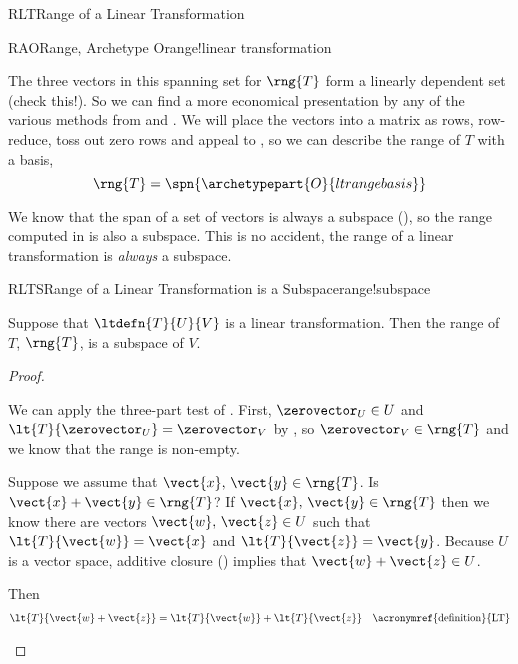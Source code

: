 \begin{subsect}{RLT}{Range of a Linear Transformation}
\begin{example}{RAO}{Range, Archetype O}{range!linear transformation}
\begin{para}
\end{para}
%
\begin{para}The three vectors in this spanning set for $\rng{T}$ form a linearly dependent set (check this!).  So we can find a more economical presentation by any of the various methods from  and .  We will place the vectors into a matrix as rows, row-reduce, toss out zero rows and appeal to , so we can describe the range of $T$ with a basis,
%
\begin{equation*}
\rng{T}=\spn{\archetypepart{O}{ltrangebasis}}\end{equation*}
\end{para}
%
\end{example}
%
\begin{para}We know that the span of a set of vectors is always a subspace (), so the range computed in  is also a subspace.  This is no accident, the range of a linear transformation is {\em always} a subspace.\end{para}
%
%
\begin{theorem}{RLTS}{Range of a Linear Transformation is a Subspace}{range!subspace}
\begin{para}Suppose that $\ltdefn{T}{U}{V}$ is a linear transformation.  Then the range of $T$, $\rng{T}$, is a subspace of $V$.\end{para}
\end{theorem}
%
\begin{proof}
\begin{para}We can apply the three-part test of .  First, $\zerovector_U\in U$ and $\lt{T}{\zerovector_U}=\zerovector_V$ by , so $\zerovector_V\in\rng{T}$ and we know that the range is non-empty.\end{para}
%
\begin{para}Suppose we assume that $\vect{x},\,\vect{y}\in\rng{T}$.  Is $\vect{x}+\vect{y}\in\rng{T}$?  If $\vect{x},\,\vect{y}\in\rng{T}$ then we know there are vectors $\vect{w},\,\vect{z}\in U$ such that $\lt{T}{\vect{w}}=\vect{x}$ and $\lt{T}{\vect{z}}=\vect{y}$.  Because $U$ is a vector space, additive closure () implies that $\vect{w}+\vect{z}\in U$.\end{para}
%
\begin{para}Then
%
\begin{align*}
\lt{T}{\vect{w}+\vect{z}}&=\lt{T}{\vect{w}}+\lt{T}{\vect{z}}&&\text{\acronymref{definition}{LT}}\\

\end{align*}
\end{para}
\end{proof}
\end{subsect}
